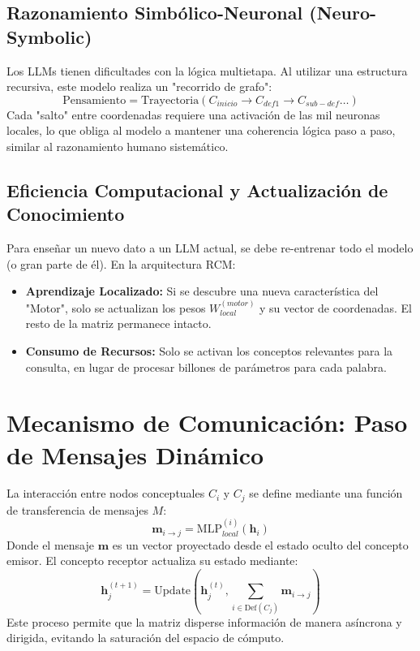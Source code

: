 \documentclass[12pt]{article}
\begin{document}
\subsection{Razonamiento Simbólico-Neuronal (Neuro-Symbolic)}
Los LLMs tienen dificultades con la lógica multietapa. Al utilizar una estructura recursiva, este modelo realiza un "recorrido de grafo":
$$ \text{Pensamiento} = \text{Trayectoria}(C_{inicio} \to C_{def1} \to C_{sub-def} \dots) $$
Cada "salto" entre coordenadas requiere una activación de las mil neuronas locales, lo que obliga al modelo a mantener una coherencia lógica paso a paso, similar al razonamiento humano sistemático.

\subsection{Eficiencia Computacional y Actualización de Conocimiento}
Para enseñar un nuevo dato a un LLM actual, se debe re-entrenar todo el modelo (o gran parte de él). En la arquitectura RCM:
\begin{itemize}
    \item \textbf{Aprendizaje Localizado:} Si se descubre una nueva característica del "Motor", solo se actualizan los pesos $W_{local}^{(motor)}$ y su vector de coordenadas. El resto de la matriz permanece intacto.
    \item \textbf{Consumo de Recursos:} Solo se activan los conceptos relevantes para la consulta, en lugar de procesar billones de parámetros para cada palabra.
\end{itemize}

\section{Mecanismo de Comunicación: Paso de Mensajes Dinámico}
La interacción entre nodos conceptuales $C_i$ y $C_j$ se define mediante una función de transferencia de mensajes $M$:
$$ \mathbf{m}_{i \to j} = \text{MLP}_{local}^{(i)}(\mathbf{h}_i) $$
Donde el mensaje $\mathbf{m}$ es un vector proyectado desde el estado oculto del concepto emisor. El concepto receptor actualiza su estado mediante:
$$ \mathbf{h}_j^{(t+1)} = \text{Update}(\mathbf{h}_j^{(t)}, \sum_{i \in \text{Def}(C_j)} \mathbf{m}_{i \to j}) $$
Este proceso permite que la matriz disperse información de manera asíncrona y dirigida, evitando la saturación del espacio de cómputo.
\end{document}
